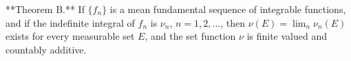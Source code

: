 **Theorem B.** If $\{f_n\}$ is a mean fundamental sequence of integrable functions, and if the indefinite integral of $f_n$ is $\nu_n$, $n=1,2,\dots$, then $\nu(E) = \lim_n \nu_n(E)$ exists for every measurable set $E$, and the set function $\nu$ is finite valued and countably additive.
